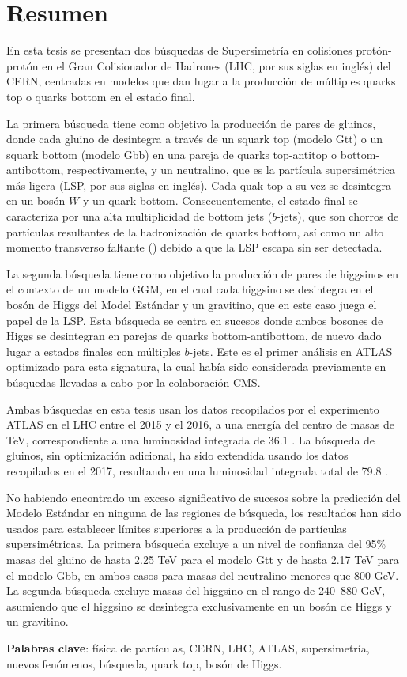 \chapter*{Resumen}

En esta tesis se presentan dos b\'usquedas de Supersimetr\'ia en colisiones prot\'on-prot\'on en el Gran Colisionador de Hadrones (LHC, por sus siglas en ingl\'es) del CERN,
centradas en modelos que dan lugar a la producci\'on de m\'ultiples quarks top o quarks bottom en el estado final.

La primera b\'usqueda tiene como objetivo la producci\'on de pares de gluinos, donde cada gluino de desintegra a trav\'es de un squark top (modelo Gtt) o un squark  
bottom (modelo Gbb) en una pareja de quarks top-antitop o bottom-antibottom, respectivamente, y un neutralino, que es la part\'icula supersim\'etrica m\'as ligera 
(LSP, por sus siglas en ingl\'es). Cada quak top a su vez se desintegra en un bos\'on $W$ y un quark bottom.
Consecuentemente, el estado final se caracteriza por una alta multiplicidad de bottom jets ($b$-jets), que son chorros de part\'iculas resultantes de
la hadronizaci\'on de quarks bottom, as\'i como un alto momento transverso faltante (\met) debido a que la LSP escapa sin ser detectada. 

La segunda b\'usqueda tiene como objetivo la producci\'on de pares de higgsinos en el contexto de un modelo GGM, en el cual cada higgsino 
se desintegra en el bos\'on de Higgs del Model Est\'andar y un gravitino, que en este caso juega el papel de la LSP.
Esta b\'usqueda se centra en sucesos donde ambos bosones de Higgs se desintegran en parejas de quarks bottom-antibottom, de nuevo dado lugar a estados finales 
con m\'ultiples $b$-jets. 
Este es el primer an\'alisis en ATLAS optimizado para esta signatura, la cual hab\'ia sido considerada previamente en b\'usquedas llevadas a cabo por
la colaboraci\'on CMS.

Ambas b\'usquedas en esta tesis usan los datos recopilados por el experimento ATLAS en el LHC 
entre el 2015 y el 2016, a una energ\'ia del centro de masas de \cmtre TeV,
correspondiente a una luminosidad integrada de 36.1 \ifb.
La b\'usqueda de gluinos, sin optimizaci\'on adicional, ha sido extendida usando los datos recopilados en el 2017, resultando en una luminosidad integrada total de 79.8 \ifb.

No habiendo encontrado un exceso significativo de sucesos sobre la predicci\'on del Modelo Est\'andar en ninguna de las regiones de b\'usqueda,
los resultados han sido usados para establecer l\'imites superiores a la producci\'on de part\'iculas supersim\'etricas.
La primera b\'usqueda excluye a un nivel de confianza del 95\% masas del gluino de hasta 2.25 TeV para el modelo Gtt
y de hasta 2.17 TeV para el modelo Gbb, en ambos casos para masas del neutralino menores que 800 GeV.
La segunda b\'usqueda excluye masas del higgsino en el rango de 240--880 GeV, asumiendo que 
el higgsino se desintegra exclusivamente en un bos\'on de Higgs y un gravitino.

\par\bigskip
\par\bigskip 
\par\bigskip

\noindent \textbf{Palabras clave}: f\'isica de part\'iculas, CERN, LHC, ATLAS, supersimetr\'ia, nuevos fen\'omenos, b\'usqueda, quark top, bos\'on de Higgs.

